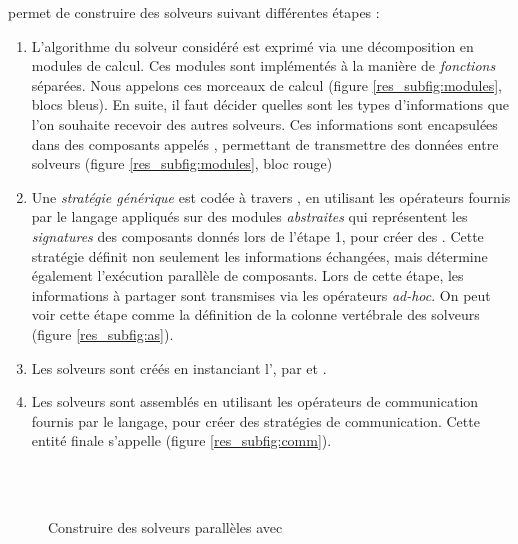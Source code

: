 \posl{} permet de construire des solveurs suivant différentes étapes : 
\begin{enumerate}
\item  L'algorithme du solveur considéré est  exprimé via une décomposition  en modules de calcul. Ces modules sont implémentés à la   manière de {\it fonctions} séparées. Nous appelons \infr{\om{}} ces morceaux de calcul (figure \ref{res_subfig:modules}, blocs bleus). En suite, il faut décider  quelles sont les types d'informations que l'on souhaite recevoir des autres solveurs. Ces informations sont encapsulées  dans des composants appelés \infr{\opch{}},  permettant de transmettre des données entre solveurs (figure \ref{res_subfig:modules}, bloc rouge) \label{res_stages:module}

\item  Une {\it stratégie générique}  est codée  à travers  \posl{}, en utilisant les  opérateurs fournis par le langage appliqués  sur des modules \textit{abstraites} qui représentent les \textit{signatures} des composants donnés lors de l'étape 1, pour créer des \infr{\ass}. Cette stratégie définit non seulement les informations échangées, mais détermine également l'exécution parallèle de composants. Lors de cette  étape, les informations à partager sont  transmises via les opérateurs \textit{ad-hoc}. On peut voir cette étape comme la définition de la colonne vertébrale des solveurs (figure \ref{res_subfig:as}).

\item  Les solveurs sont créés en instanciant l'\infr{\as}, par \infr{\oms{}} et \infr{\opchs}. %

\item Les solveurs sont assemblés en utilisant les opérateurs de communication fournis par le langage, pour créer des stratégies de communication. Cette entité finale s'appelle \infr{\soset{}} (figure \ref{res_subfig:comm}).
\end{enumerate}

\begin{figure}
	\centering
	\\
	\\
	\caption[]{Construire des solveurs parallèles avec \posl{}}
	\label{res_fig:posl}
\end{figure}%

